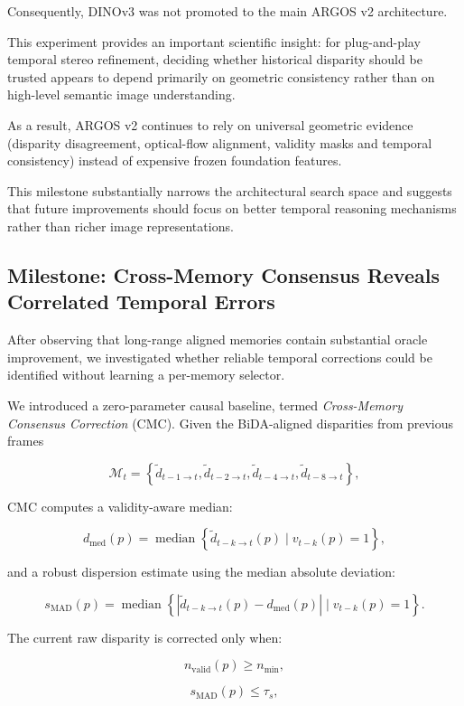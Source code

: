 \documentclass[11pt,a4paper]{article}
\begin{document}
Consequently, DINOv3 was not promoted to the main ARGOS v2 architecture.

This experiment provides an important scientific insight: for plug-and-play temporal stereo refinement, deciding whether historical disparity should be trusted appears to depend primarily on geometric consistency rather than on high-level semantic image understanding.

As a result, ARGOS v2 continues to rely on universal geometric evidence (disparity disagreement, optical-flow alignment, validity masks and temporal consistency) instead of expensive frozen foundation features.

This milestone substantially narrows the architectural search space and suggests that future improvements should focus on better temporal reasoning mechanisms rather than richer image representations.

\subsection{Milestone: Cross-Memory Consensus Reveals Correlated Temporal Errors}

After observing that long-range aligned memories contain substantial oracle improvement, we investigated whether reliable temporal corrections could be identified without learning a per-memory selector.

We introduced a zero-parameter causal baseline, termed \emph{Cross-Memory Consensus Correction} (CMC). Given the BiDA-aligned disparities from previous frames

\[
\mathcal{M}_t =
\left\{
\tilde d_{t-1\rightarrow t},
\tilde d_{t-2\rightarrow t},
\tilde d_{t-4\rightarrow t},
\tilde d_{t-8\rightarrow t}
\right\},
\]

CMC computes a validity-aware median:

\[
d_{\mathrm{med}}(p)
=
\operatorname{median}
\left\{
\tilde d_{t-k\rightarrow t}(p)
\mid v_{t-k}(p)=1
\right\},
\]

and a robust dispersion estimate using the median absolute deviation:

\[
s_{\mathrm{MAD}}(p)
=
\operatorname{median}
\left\{
\left|
\tilde d_{t-k\rightarrow t}(p)
-
d_{\mathrm{med}}(p)
\right|
\mid v_{t-k}(p)=1
\right\}.
\]

The current raw disparity is corrected only when:

\[
n_{\mathrm{valid}}(p) \geq n_{\min},
\]

\[
s_{\mathrm{MAD}}(p) \leq \tau_s,
\]
\end{document}

